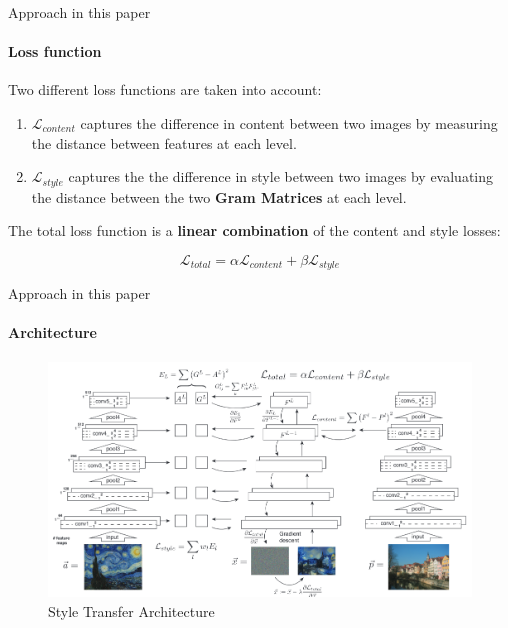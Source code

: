 \documentclass{beamer}
\begin{document}
\begin{frame}{Approach in this paper}
    \framesubtitle{Loss function}

    Two different loss functions are taken into account:

    \begin{enumerate}
        \item $\mathcal{L}_{content}$ captures the difference in content
            between two images by measuring the distance between features at
            each level.
        \item $\mathcal{L}_{style}$ captures the the difference in style
            between two images by evaluating the distance between the two
            \textbf{Gram Matrices} at each level.
    \end{enumerate}

    The total loss function is a
    \textbf{\color{red} linear combination}
    of the content and style losses:

    \begin{equation}
    \mathcal{L}_{total} =
    \alpha \mathcal{L}_{content} +
    \beta \mathcal{L}_{style}
    \end{equation}
\end{frame}



\begin{frame}{Approach in this paper}
\framesubtitle{Architecture}
\begin{figure}[ht]
\centering
\caption*{Style Transfer Architecture}
\includegraphics[width=\textwidth]{img/style-transfer}
\end{figure}
\end{frame}
\end{document}
